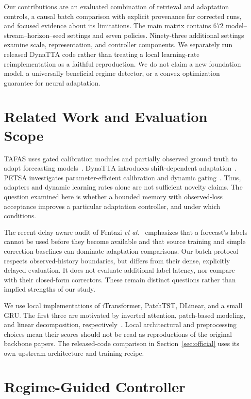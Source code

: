 \documentclass[conference]{IEEEtran}
\begin{document}
Our contributions are an evaluated combination of retrieval and adaptation controls, a causal batch comparison with explicit provenance for corrected runs, and focused evidence about its limitations. The main matrix contains 672 model--stream--horizon--seed settings and seven policies. Ninety-three additional settings examine scale, representation, and controller components. We separately run released DynaTTA code rather than treating a local learning-rate reimplementation as a faithful reproduction. We do not claim a new foundation model, a universally beneficial regime detector, or a convex optimization guarantee for neural adaptation.

\section{Related Work and Evaluation Scope}
TAFAS uses gated calibration modules and partially observed ground truth to adapt forecasting models~\cite{tafas}. DynaTTA introduces shift-dependent adaptation~\cite{dynatta}. PETSA investigates parameter-efficient calibration and dynamic gating~\cite{petsa}. Thus, adapters and dynamic learning rates alone are not sufficient novelty claims. The question examined here is whether a bounded memory with observed-loss acceptance improves a particular adaptation controller, and under which conditions.

The recent delay-aware audit of Fentazi \emph{et al.}~\cite{delay} emphasizes that a forecast's labels cannot be used before they become available and that source training and simple correction baselines can dominate adaptation comparisons. Our batch protocol respects observed-history boundaries, but differs from their dense, explicitly delayed evaluation. It does not evaluate additional label latency, nor compare with their closed-form correctors. These remain distinct questions rather than implied strengths of our study.

We use local implementations of iTransformer, PatchTST, DLinear, and a small GRU. The first three are motivated by inverted attention, patch-based modeling, and linear decomposition, respectively~\cite{itransformer,patchtst,dlinear}. Local architectural and preprocessing choices mean their scores should not be read as reproductions of the original backbone papers. The released-code comparison in Section~\ref{sec:official} uses its own upstream architecture and training recipe.

\section{Regime-Guided Controller}
\end{document}

